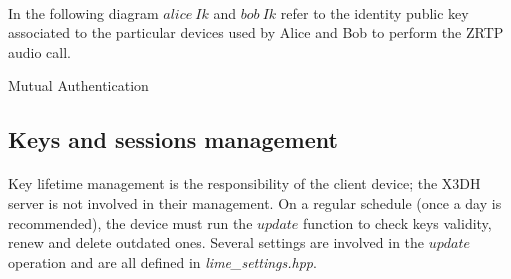 \documentclass[a4paper,11pt]{article}
\begin{document}
    \paragraph{}In the following diagram $alice\ Ik$ and $bob\ Ik$ refer to the identity public key associated to the particular devices used by Alice and Bob to perform the ZRTP audio call.\\\newline
    \begin{msc}{Mutual Authentication}
    \setlength{\instdist}{9cm}
    \setlength{\envinstdist}{2.5cm}
    \nextlevel
    \nextlevel
    \nextlevel[3]
    \nextlevel
    \nextlevel[2]
    \nextlevel[3]
    \end{msc}

  \subsection{Keys and sessions management}
    \paragraph{}Key lifetime management is the responsibility of the client device; the X3DH server is not involved in their management. On a regular schedule (once a day is recommended), the device must run the $update$ function to check keys validity, renew and delete outdated ones. Several settings are involved in the $update$ operation and are all defined in \textit{lime\_settings.hpp}.
\end{document}
